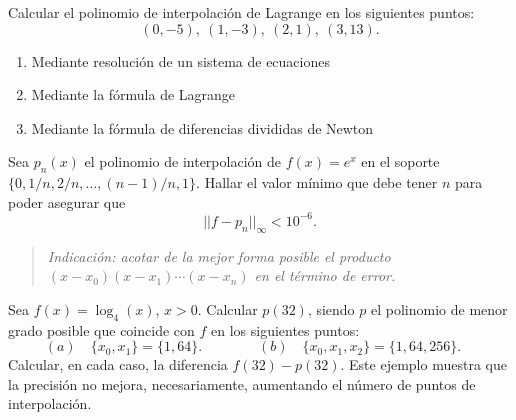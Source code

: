 \begin{problemas}
  \begin{problema}
    Calcular el polinomio de interpolación de Lagrange en los
    siguientes puntos:
    $$
    (0,-5),\ (1,-3),\ (2,1),\ (3,13).
    $$
    \begin{enumerate}
    \item Mediante resolución de un sistema de ecuaciones
    \item Mediante la fórmula de Lagrange
    \item Mediante la fórmula de diferencias divididas de Newton
    \end{enumerate}

  \end{problema}





  \begin{problema}
    Sea $p_n(x)$ el polinomio de interpolación de $f(x)=e^x$ en el
    soporte $\{0,1/n,2/n,\dots,(n-1)/n,1\}$. Hallar el valor mínimo
    que debe tener $n$ para poder asegurar que
    $$
    ||f-p_n||_\infty<10^{-6}.
    $$
    \begin{quotation}
      \small\em Indicación: acotar de la mejor forma posible el
      producto $(x-x_0)(x-x_1)\cdots(x-x_n)$ en el término de error.
    \end{quotation}
  \end{problema}

  \begin{problema}
    Sea $f(x)=\log_4(x)$, $x>0$. Calcular $p(32)$, siendo $p$ el
    polinomio de menor grado posible que coincide con $f$ en los
    siguientes puntos:
    \begin{equation*}
      (a) \quad \{x_0,x_1\}=\{1,64\}. \qquad\qquad
      (b) \quad \{x_0,x_1,x_2\}=\{1,64,256\}.
      \quad
    \end{equation*}
    Calcular, en cada caso, la diferencia $f(32)-p(32)$. Este ejemplo
    muestra que la precisión no mejora, necesariamente, aumentando el
    número de puntos de interpolación.
  \end{problema}
  \end{problemas}
